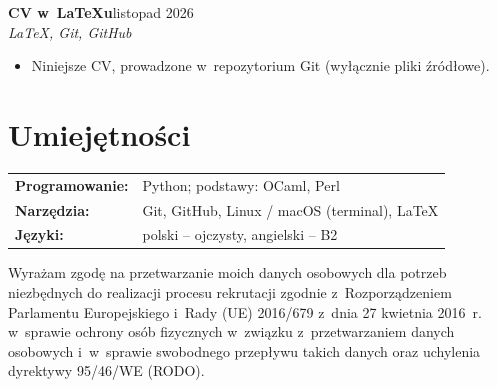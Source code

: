 \documentclass[10pt,a4paper]{article}
\newcommand{\pozycja}[3]{%
  \textbf{#1}\hfill{\small #2}\\
  {\itshape #3}\par}
\begin{document}
\pozycja{CV w~\LaTeX{}u}{listopad 2026}{\LaTeX, Git, GitHub}
\begin{itemize}
  \item Niniejsze CV, prowadzone w~repozytorium Git (wyłącznie pliki źródłowe).
\end{itemize}

\section*{Umiejętności}
\begin{tabularx}{\linewidth}{@{}l X@{}}
  \textbf{Programowanie:} & Python; podstawy: OCaml, Perl \\
  \textbf{Narzędzia:}     & Git, GitHub, Linux / macOS (terminal), \LaTeX \\
  \textbf{Języki:}        & polski -- ojczysty, angielski -- B2 \\
\end{tabularx}

\vfill
{\scriptsize\color{gray}
Wyrażam zgodę na przetwarzanie moich danych osobowych dla potrzeb niezbędnych
do realizacji procesu rekrutacji zgodnie z~Rozporządzeniem Parlamentu Europejskiego
i~Rady (UE) 2016/679 z~dnia 27 kwietnia 2016~r. w~sprawie ochrony osób fizycznych
w~związku z~przetwarzaniem danych osobowych i~w~sprawie swobodnego przepływu takich
danych oraz uchylenia dyrektywy 95/46/WE (RODO).\par}
\end{document}
